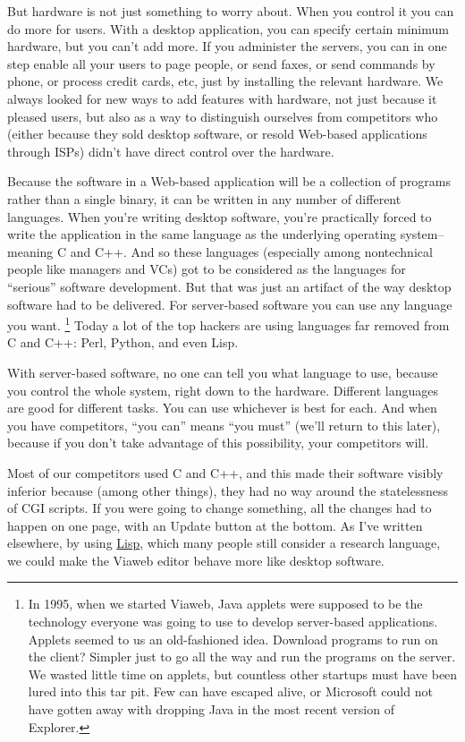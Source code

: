 But hardware is not just something to worry about. When you control it
you can do more for users. With a desktop application, you can specify
certain minimum hardware, but you can't add more. If you administer the
servers, you can in one step enable all your users to page people, or
send faxes, or send commands by phone, or process credit cards, etc,
just by installing the relevant hardware. We always looked for new ways
to add features with hardware, not just because it pleased users, but
also as a way to distinguish ourselves from competitors who (either
because they sold desktop software, or resold Web-based applications
through ISPs) didn't have direct control over the hardware.

Because the software in a Web-based application will be a collection of
programs rather than a single binary, it can be written in any number of
different languages. When you're writing desktop software, you're
practically forced to write the application in the same language as the
underlying operating system-- meaning C and C++. And so these languages
(especially among nontechnical people like managers and VCs) got to be
considered as the languages for ``serious'' software development. But
that was just an artifact of the way desktop software had to be
delivered. For server-based software you can use any language you want.
\footnote{In 1995, when we started Viaweb, Java applets were supposed to
be the technology everyone was going to use to develop server-based
applications. Applets seemed to us an old-fashioned idea. Download
programs to run on the client? Simpler just to go all the way and run
the programs on the server. We wasted little time on applets, but
countless other startups must have been lured into this tar pit. Few can
have escaped alive, or Microsoft could not have gotten away with
dropping Java in the most recent version of Explorer.} Today a lot of the top hackers are using languages far removed
from C and C++: Perl, Python, and even Lisp.

With server-based software, no one can tell you what language to use,
because you control the whole system, right down to the hardware.
Different languages are good for different tasks. You can use whichever
is best for each. And when you have competitors, ``you can'' means ``you
must'' (we'll return to this later), because if you don't take advantage
of this possibility, your competitors will.

Most of our competitors used C and C++, and this made their software
visibly inferior because (among other things), they had no way around
the statelessness of CGI scripts. If you were going to change something,
all the changes had to happen on one page, with an Update button at the
bottom. As I've written elsewhere, by using \href{avg.html}{Lisp}, which
many people still consider a research language, we could make the Viaweb
editor behave more like desktop software.

